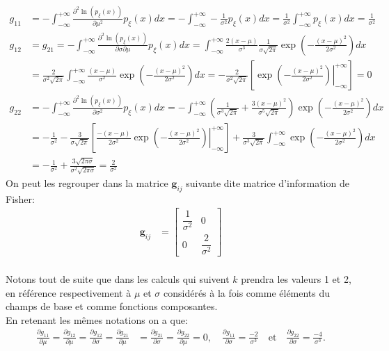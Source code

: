 \documentclass[11pt,french]{article}
\begin{document}
    \begin{align*}
    g_{11}&=-\int_{-\infty}^{+\infty}\frac{\partial^2\ln(p_{\xi}(x))}{\partial\mu^2}p_{\xi}(x)dx=-\int_{-\infty}^{+\infty}-\frac{1}{\sigma^2}p_{\xi}(x)dx=\frac{1}{\sigma^2}\int_{-\infty}^{+\infty}p_{\xi}(x)dx=\frac{1}{\sigma^2}
    \\
    g_{12}&=g_{21}=-\int_{-\infty}^{+\infty}\frac{\partial^2\ln(p_{\xi}(x))}{\partial\sigma\partial\mu}p_{\xi}(x)dx=\int_{-\infty}^{+\infty}\frac{2(x-\mu)}{\sigma^3}\frac{1}{\sigma\sqrt{2\pi}}\exp\left(-\frac{(x-\mu)^2}{2\sigma^2}\right)dx\\
    &=\frac{2}{\sigma^2\sqrt{2\pi}}\int_{-\infty}^{+\infty}\frac{(x-\mu)}{\sigma^2}\exp\left(-\frac{(x-\mu)^2}{2\sigma^2}\right)dx=-\frac{2}{\sigma^2\sqrt{2\pi}}\left[\left.\exp\left(-\frac{(x-\mu)^2}{2\sigma^2}\right)\right|_
    {-\infty}^{+\infty}\right]=0\\
    g_{22}&=-\int_{-\infty}^{+\infty}\frac{\partial^2\ln(p_{\xi}(x))}{\partial\sigma^2}p_{\xi}(x)dx=-\int_{-\infty}^{+\infty}\left (\frac{1}{\sigma^3\sqrt{2\pi}}+\frac{3(x-\mu)^2}{\sigma^5\sqrt{2\pi}}\right)\exp\left(-\frac{(x-\mu)^2}{2\sigma^2}\right)dx\\
    &=-\frac{1}{\sigma^2}
    -\frac{3}{\sigma\sqrt{2\pi}}\left[\left.\frac{-(x-\mu)}{2\sigma^2}\exp\left(-\frac{(x-\mu)^2}{2\sigma^2}\right)\right|_{-\infty}^{+\infty}\right]+\frac{3}{\sigma^3\sqrt{2\pi}}\int_{-\infty}^{+\infty}\exp\left(-\frac{(x-\mu)^2}{2\sigma^2}\right)dx\\
    &=-\frac{1}{\sigma^2}+\frac{3\sqrt{2\pi\sigma}}{\sigma^2\sqrt{2\pi\sigma}}=\frac{2}{\sigma^2}
    \end{align*} 
On peut les regrouper dans la  matrice $\mathbf{g}_{ij}$ suivante dite matrice d'information de Fisher:
\begin{align*}
\mathbf{g}_{ij}
&=
    \begin{bmatrix}
    \dfrac{1}{\sigma^2} & 0
    \\[9pt]
    0 & \dfrac{2}{\sigma^2}
    \end{bmatrix}
\end{align*}\\

Notons tout de suite que dans les calculs qui suivent $k$ prendra les valeurs 1 et 2, en référence respectivement à $\mu$ et $\sigma$ considérés à la fois comme éléments du champs de base et comme fonctions composantes.\\

En retenant les mêmes notations on a que:
\begin{align*}
    \frac{\partial g_{11}}{\partial\mu}=\frac{\partial g_{12}}{\partial\mu}=\frac{\partial g_{12}}{\partial\sigma}=\frac{\partial g_{21}}{\partial\mu}
    &=\frac{\partial g_{21}}{\partial\sigma}=\frac{\partial g_{22}}{\partial\mu}=0, \quad
    \frac{\partial g_{11}}{\partial\sigma}=\frac{-2}{\sigma^3} \quad \text{et} \quad
    \frac{\partial g_{22}}{\partial\sigma}=\frac{-4}{\sigma^3}.
\end{align*}
\end{document}
